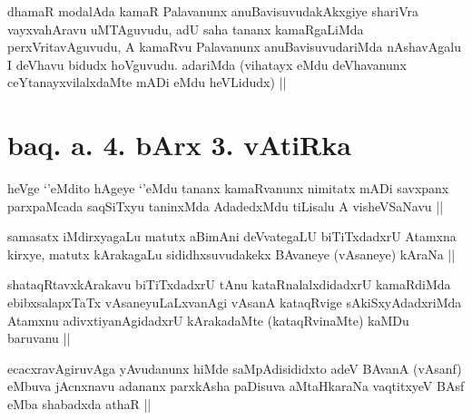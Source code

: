 
\begin{artha}
dhamaR modalAda kamaR Palavanunx anuBavisuvudakAkxgiye shariVra vayxvahAravu uMTAguvudu, adU saha tananx kamaRgaLiMda perxVritavAguvudu, A kamaRvu Palavanunx anuBavisuvudariMda nAshavAgalu I deVhavu bidudx hoVguvudu. adariMda (vihatayx eMdu deVhavanunx ceYtanayxvilalxdaMte mADi eMdu heVLidudx) ||
\end{artha}

\section*{baq. a. 4. bArx 3. vAtiRka}


\begin{artha}
heVge `\stext'eMdito hAgeye `\stext'eMdu tananx kamaRvanunx nimitatx mADi savxpanx parxpaMcada saqSiTxyu taninxMda AdadedxMdu tiLisalu A visheVSaNavu || 
\end{artha}


\begin{artha}
samasatx iMdirxyagaLu matutx aBimAni deVvategaLU biTiTxdadxrU Atamxna kirxye, matutx kArakagaLu sididhxsuvudakekx BAvaneye (vAsaneye) kAraNa ||
\end{artha}


\begin{artha}
shataqRtavxkArakavu biTiTxdadxrU tAnu kataRnalalxdidadxrU kamaRdiMda ebibxsalapxTaTx vAsaneyuLaLxvanAgi vAsanA kataqRvige sAkiSxyAdadxriMda Atamxnu adivxtiyanAgidadxrU kArakadaMte (kataqRvinaMte) kaMDu baruvanu ||
\end{artha}


\begin{artha}
ecacxravAgiruvAga yAvudanunx hiMde saMpAdisididxto adeV BAvanA (vAsanf) eMbuva jAcnxnavu adananx parxkAsha paDisuva aMtaHkaraNa vaqtitxyeV BAsf eMba shabadxda athaR ||
\end{artha}
